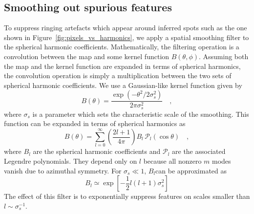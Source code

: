 \documentclass[linenumbers,modern]{aastex62}
\begin{document}
\subsection{Smoothing out spurious features}
\label{ssec:spurious_features}
To suppress ringing artefacts which appear around inferred spots such as the one shown in Figure~\ref{fig:pixels_vs_harmonics}, we apply a spatial smoothing filter to the spherical harmonic coefficients.
Mathematically, the filtering operation is a convolution between the map and some kernel function $B(\theta,\phi)$.
Assuming both the map and the kernel function are expanded in terms of spherical harmonics, the convolution operation is simply a multiplication between the two sets of spherical harmonic coefficients.
We use a Gaussian-like kernel function given by
\begin{equation}
    B(\theta)=\frac{\exp \left(-\theta^{2} / 2 \sigma_s^{2}\right)}{2 \pi \sigma_s^{2}}
    \quad,
\end{equation}
where $\sigma_s$ is a parameter which sets the characteristic scale of the smoothing.
This function can be expanded in terms of spherical harmonics as
\begin{equation}
    B(\theta)=\sum_{l=0}^{\infty}\left(\frac{2 l+1}{4 \pi}\right) B_{l} \,\mathcal{P}_{l}(\cos \theta)
    \quad,
\end{equation}
where $B_l$ are the spherical harmonic coefficients and $\mathcal{P}_l$ are the associated Legendre polynomials.
They depend only on $l$ because all nonzero $m$ modes vanish due to azimuthal symmetry.
For $\sigma_s\ll 1$, $B_l$can be approximated as \citep{seon2007,white1995}
\begin{equation}
    B_l\simeq \exp\left[-\frac{1}{2}l(l+1)\sigma_s^2\right]
\end{equation}
The effect of this filter is to exponentially suppress features on scales smaller than $l\sim \sigma_s^{-1}$.
\end{document}
